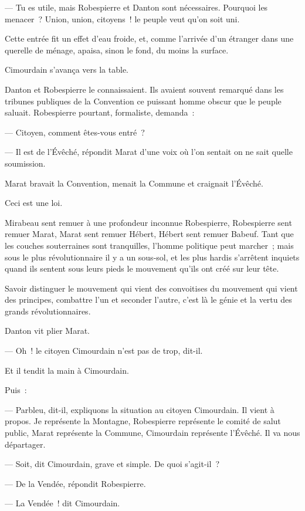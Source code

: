 \documentclass[french,twoside]{book} %
\begin{document}
— Tu es utile, mais Robespierre et Danton sont nécessaires. Pourquoi les menacer ? Union, union, citoyens ! le peuple veut qu’on soit uni.\par
Cette entrée fit un effet d’eau froide, et, comme l’arrivée d’un étranger dans une querelle de ménage, apaisa, sinon le fond, du moins la surface.\par
Cimourdain s’avança vers la table.\par
Danton et Robespierre le connaissaient. Ils avaient souvent remarqué dans les tribunes publiques de la Convention ce puissant homme obscur que le peuple saluait. Robespierre pourtant, formaliste, demanda :\par
— Citoyen, comment êtes-vous entré ?\par
— Il est de l’Évêché, répondit Marat d’une voix où l’on sentait on ne sait quelle soumission.\par
 Marat bravait la Convention, menait la Commune et craignait l’Évêché.\par
Ceci est une loi.\par
Mirabeau sent remuer à une profondeur inconnue Robespierre, Robespierre sent remuer Marat, Marat sent remuer Hébert, Hébert sent remuer Babeuf. Tant que les couches souterraines sont tranquilles, l’homme politique peut marcher ; mais sous le plus révolutionnaire il y a un sous-sol, et les plus hardis s’arrêtent inquiets quand ils sentent sous leurs pieds le mouvement qu’ils ont créé sur leur tête.\par
Savoir distinguer le mouvement qui vient des convoitises du mouvement qui vient des principes, combattre l’un et seconder l’autre, c’est là le génie et la vertu des grands révolutionnaires.\par
Danton vit plier Marat.\par
— Oh ! le citoyen Cimourdain n’est pas de trop, dit-il.\par
Et il tendit la main à Cimourdain.\par
Puis :\par
— Parbleu, dit-il, expliquons la situation au citoyen Cimourdain. Il vient à propos. Je représente la Montagne, Robespierre représente le comité de salut public, Marat représente la Commune, Cimourdain représente l’Évêché. Il va nous départager.\par
— Soit, dit Cimourdain, grave et simple. De quoi s’agit-il ?\par
— De la Vendée, répondit Robespierre.\par
— La Vendée ! dit Cimourdain.\par
\end{document}

